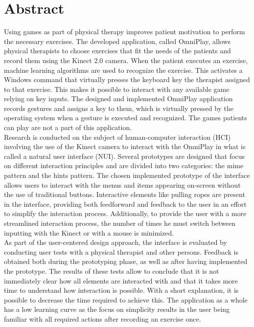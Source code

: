 \chapter*{Abstract}

Using games as part of physical therapy improves patient motivation to perform the necessary exercises. The developed application, called OmniPlay, allows physical therapists to choose exercises that fit the needs of the patients and record them using the Kinect 2.0 camera. When the patient executes an exercise, machine learning algorithms are used to recognize the exercise. This activates a Windows command that virtually presses the keyboard key the therapist assigned to that exercise. This makes it possible to interact with any available game relying on key inputs. The designed and implemented OmniPlay application records gestures and assigns a key to them, which is virtually pressed by the operating system when a gesture is executed and recognized. The games patients can play are not a part of this application.\\

Research is conducted on the subject of human-computer interaction (HCI) involving the use of the Kinect camera to interact with the OmniPlay in what is called a natural user interface (NUI). Several prototypes are designed that focus on different interaction principles and are divided into two categories: the mime pattern and the hints pattern. The chosen implemented prototype of the interface allows users to interact with the menus and items appearing on-screen without the use of traditional buttons. Interactive elements like pulling ropes are present in the interface, providing both feedforward and feedback to the user in an effort to simplify the interaction process. Additionally, to provide the user with a more streamlined interaction process, the number of times he must switch between inputting with the Kinect or with a mouse is minimized.\\

As part of the user-centered design approach, the interface is evaluated by conducting user tests with a physical therapist and other persons. Feedback is obtained both during the prototyping phase, as well as after having implemented the prototype. The results of these tests allow to conclude that it is not immediately clear how all elements are interacted with and that it takes more time to understand how interaction is possible. With a short explanation, it is possible to decrease the time required to achieve this. The application as a whole has a low learning curve as the focus on simplicity results in the user being familiar with all required actions after recording an exercise once.\\

